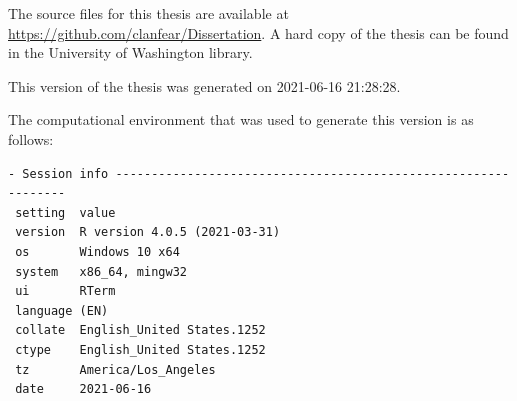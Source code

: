 \documentclass [11pt, proquest] {uwthesis}[2015/03/03]
\begin{document}
The source files for this thesis are available at \url{https://github.com/clanfear/Dissertation}. A hard copy of the thesis can be found in the University of Washington library.

This version of the thesis was generated on 2021-06-16 21:28:28.

The computational environment that was used to generate this version is as follows:
\begin{verbatim}
- Session info ---------------------------------------------------------------
 setting  value                       
 version  R version 4.0.5 (2021-03-31)
 os       Windows 10 x64              
 system   x86_64, mingw32             
 ui       RTerm                       
 language (EN)                        
 collate  English_United States.1252  
 ctype    English_United States.1252  
 tz       America/Los_Angeles         
 date     2021-06-16                  


\end{verbatim}
\end{document}
